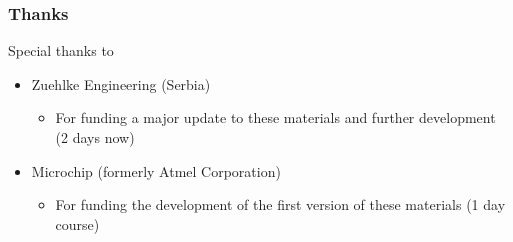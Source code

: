 \begin{frame}
\frametitle{Thanks}
   Special thanks to
   \begin{itemize}
     \item Zuehlke Engineering (Serbia)
     \begin{itemize}
           \item For funding a major update to these materials and
           further development (2 days now)
     \end{itemize}
     \item Microchip (formerly Atmel Corporation)
     \begin{itemize}
           \item For funding the development of the first version of
           these materials (1 day course)
     \end{itemize}
   \end{itemize}
\end{frame}
